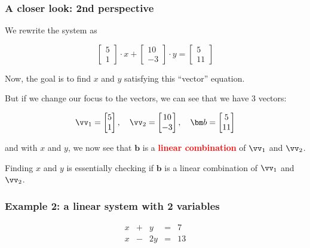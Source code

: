 \begin{frame}
  \frametitle{A closer look: 2nd perspective}
  We rewrite the system as

  \[
  \begin{bmatrix}
    5 \\ 1
  \end{bmatrix}
  \cdot x +
  \begin{bmatrix}
    10 \\ -3
  \end{bmatrix}
  \cdot y
  =
  \begin{bmatrix}
    5 \\ 11
  \end{bmatrix}
  \]

  \pause

  Now, the goal is to find $x$ and $y$ satisfying this ``vector'' equation.

  \pause

  But if we change our focus to the vectors, we can see that we have 3 vectors:

  \[
  \vv_1=
  \begin{bmatrix}
    5 \\ 1
  \end{bmatrix},
  \ \ \
  \vv_2 = 
  \begin{bmatrix}
    10 \\ -3
  \end{bmatrix},
  \ \ \
  {\bm b} =
  \begin{bmatrix}
    5 \\ 11
  \end{bmatrix}
  \]

  \pause

  and with $x$ and $y$, we now see that ${\bm b}$ is a \textcolor{red}{\bf linear combination} of $\vv_1$ and $\vv_2$.
  
  Finding $x$ and $y$ is essentially checking if ${\bm b}$ is a linear combination of $\vv_1$ and $\vv_2$.
\end{frame}


\begin{frame}
\frametitle{Example 2: a linear system with 2 variables}
  {\small
  \[
  \begin{array}{rcrcrcl}
    x & + & y & = & 7 \\
    x & - & 2y & = & 13 \\
  \end{array}
  \]
  }


\end{frame}


